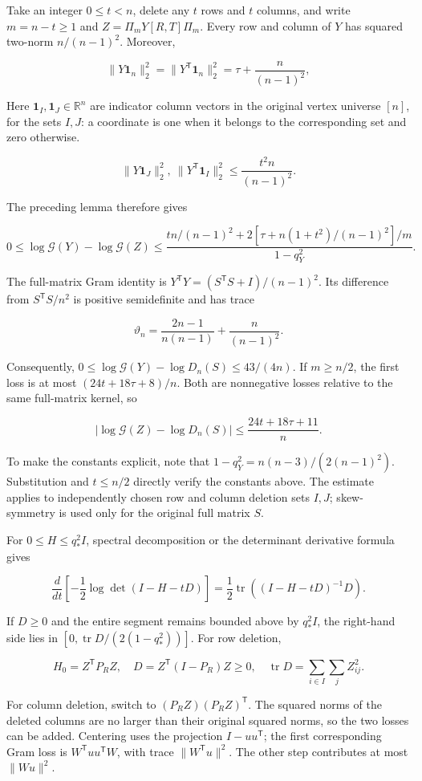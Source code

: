 \documentclass[11pt,a4paper]{article}
\begin{document}
Take an integer \(0\le t<n\), delete any \(t\) rows and \(t\) columns, and write \(m=n-t\ge1\) and \(Z=\Pi_mY[R,T]\Pi_m\). Every row and column of \(Y\) has squared two-norm \(n/(n-1)^2\). Moreover,

\[
\|Y\mathbf 1_n\|_2^2=\|Y^{\mathsf T}\mathbf 1_n\|_2^2=\tau+\frac n{(n-1)^2},
\]

Here \(\mathbf1_I,\mathbf1_J\in\mathbb R^n\) are indicator column vectors in the original vertex universe \([n]\), for the sets \(I,J\): a coordinate is one when it belongs to the corresponding set and zero otherwise.

\[
\|Y\mathbf 1_J\|_2^2,\ \|Y^{\mathsf T}\mathbf 1_I\|_2^2\le\frac{t^2n}{(n-1)^2}.
\]

The preceding lemma therefore gives

\[
0\le\log\mathcal G(Y)-\log\mathcal G(Z)\le\frac{t n/(n-1)^2+2[\tau+n(1+t^2)/(n-1)^2]/m}{1-q_Y^2}.
\]

The full-matrix Gram identity is \(Y^{\mathsf T}Y=(S^{\mathsf T}S+I)/(n-1)^2\). Its difference from \(S^{\mathsf T}S/n^2\) is positive semidefinite and has trace

\[
\vartheta_n=\frac{2n-1}{n(n-1)}+\frac n{(n-1)^2}.
\]

Consequently, \(0\le\log\mathcal G(Y)-\log D_n(S)\le43/(4n)\). If \(m\ge n/2\), the first loss is at most \((24t+18\tau+8)/n\). Both are nonnegative losses relative to the same full-matrix kernel, so

\[
|\log\mathcal G(Z)-\log D_n(S)|\le\frac{24t+18\tau+11}{n}.
\]

To make the constants explicit, note that \(1-q_Y^2=n(n-3)/(2(n-1)^2)\). Substitution and \(t\le n/2\) directly verify the constants above. The estimate applies to independently chosen row and column deletion sets \(I,J\); skew-symmetry is used only for the original full matrix \(S\).

For \(0\le H\le q_*^2I\), spectral decomposition or the determinant derivative formula gives

\[
\frac{d}{dt}\left[-\frac12\log\det(I-H-tD)\right]
=\frac12\operatorname{tr}((I-H-tD)^{-1}D).
\]

If \(D\ge0\) and the entire segment remains bounded above by \(q_*^2I\), the right-hand side lies in \([0,\operatorname{tr}D/(2(1-q_*^2))]\). For row deletion,

\[
H_0=Z^{\mathsf T}P_RZ,\quad
D=Z^{\mathsf T}(I-P_R)Z\ge0,\quad
\operatorname{tr}D=\sum_{i\in I}\sum_jZ_{ij}^2.
\]

For column deletion, switch to \((P_RZ)(P_RZ)^{\mathsf T}\). The squared norms of the deleted columns are no larger than their original squared norms, so the two losses can be added. Centering uses the projection \(I-uu^{\mathsf T}\); the first corresponding Gram loss is \(W^{\mathsf T}uu^{\mathsf T}W\), with trace \(\|W^{\mathsf T}u\|^2\). The other step contributes at most \(\|Wu\|^2\).
\end{document}
